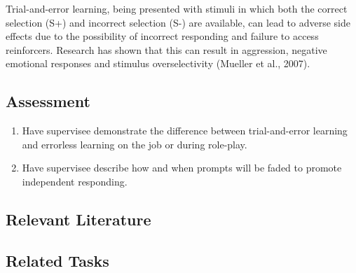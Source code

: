 Trial-and-error learning, being presented with stimuli in which both the correct selection (S+) and incorrect selection (S-) are available, can lead to adverse side effects due to the possibility of incorrect responding and failure to access reinforcers. Research has shown that this can result in aggression, negative emotional responses and stimulus overselectivity (Mueller et al., 2007).
%
\subsection{Assessment}
\begin{enumerate}
\item Have supervisee demonstrate the difference between trial-and-error learning and errorless learning on the job or during role-play.
\item Have supervisee describe how and when prompts will be faded to promote independent responding. 
%
\end{enumerate}
%
\subsection{Relevant Literature}
\begin{refsection}
\nocite{fillingham2003application,
        mueller2007errorless,
        terrace1963errorless}
\printbibliography[heading=none]
\end{refsection}
%
\subsection{Related Tasks} 
\fourdThree{}\\
\fourdFour{}\\
\fourFKTwentyFour{}\\
